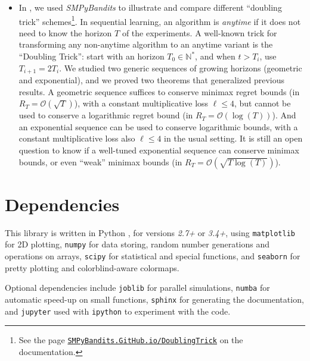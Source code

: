 \documentclass[a4paper,10pt,]{article}
\providecommand{\tightlist}{%
  \setlength{\itemsep}{0pt}\setlength{\parskip}{0pt}}
\begin{document}
\begin{itemize}
\tightlist
\item
  In \citet{Besson2018DoublingTricks}, we used \emph{SMPyBandits} to illustrate and
  compare different ``doubling trick'' schemes\footnote{See the
    page
    \href{https://SMPyBandits.GitHub.io/DoublingTrick.html}{\texttt{SMPyBandits.GitHub.io/DoublingTrick}}
    on the documentation.}. In sequential learning, an algorithm is
  \emph{anytime} if it does not need to know the horizon \(T\) of the
  experiments. A well-known trick for transforming any non-anytime
  algorithm to an anytime variant is the ``Doubling Trick'': start with
  an horizon \(T_0\in\mathbb{N}^*\), and when \(t > T_i\), use
  \(T_{i+1} = 2 T_i\). We studied two generic sequences of growing
  horizons (geometric and exponential), and we proved two theorems that
  generalized previous results. A geometric sequence suffices to conserve minimax
  regret bounds (in \(R_T = \mathcal{O}(\sqrt{T})\)), with a constant
  multiplicative loss \(\ell \leq 4\), but cannot be used to conserve a
  logarithmic regret bound (in \(R_T = \mathcal{O}(\log(T))\)). And an
  exponential sequence can be used to conserve logarithmic bounds, with
  a constant multiplicative loss also \(\ell \leq 4\) in the usual
  setting. It is still an open question to know if a well-tuned
  exponential sequence can conserve minimax bounds, or even ``weak'' minimax
  bounds (in \(R_T = \mathcal{O}(\sqrt{T \log(T)})\)).
\end{itemize}

\section{Dependencies}\label{dependencies}

This library is written in Python \citep{python}, for versions \emph{2.7+} or \emph{3.4+},
using \texttt{matplotlib} \citep{matplotlib} for 2D plotting,
\texttt{numpy} \citep{numpy} for data storing, random number generations
and operations on arrays, \texttt{scipy} \citep{scipy} for
statistical and special functions, and \texttt{seaborn} \citep{seaborn}
for pretty plotting and colorblind-aware colormaps.

Optional dependencies include \texttt{joblib} \citep{joblib} for parallel
simulations, \texttt{numba} \citep{numba} for automatic speed-up on small
functions, \texttt{sphinx} \citep{sphinx} for generating the
documentation, and \texttt{jupyter}
\citep{jupyter} used with \texttt{ipython} \citep{ipython} to experiment
with the code.

\begin{normalsize}
  
\end{normalsize}
\end{document}
